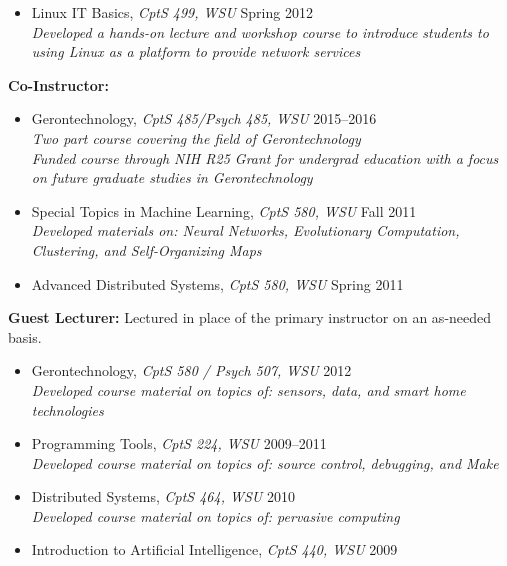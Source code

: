   \begin{itemize}
    \item{Linux IT Basics, \textit{CptS 499, WSU} \hfill Spring 2012} \\
    \indent \textit{Developed a hands-on lecture and workshop course to introduce students to} \\
    \indent \textit{using Linux as a platform to provide network services}
  \end{itemize}


\textbf{Co-Instructor:}
  \begin{itemize}
    \item{Gerontechnology, \textit{CptS 485/Psych 485, WSU} \hfill 2015--2016} \\
    \indent \textit{Two part course covering the field of Gerontechnology} \\
    \indent \textit{Funded course through NIH R25 Grant for undergrad education with a focus on future graduate studies in Gerontechnology}
  \end{itemize}

    \begin{itemize}
       \item{Special Topics in Machine Learning, \textit{CptS 580, WSU} \hfill Fall 2011} \\
	\indent \textit{Developed materials on: Neural Networks, Evolutionary Computation,} \\
	\indent \textit{Clustering, and Self-Organizing Maps}
	\item{Advanced Distributed Systems, \textit{CptS 580, WSU} \hfill Spring 2011}
    \end{itemize}

\textbf{Guest Lecturer:} Lectured in place of the primary instructor on an as-needed basis.
    \begin{itemize}
	\item{Gerontechnology, \textit{CptS 580 / Psych 507, WSU} \hfill 2012} \\
	\indent \textit{Developed course material on topics of: sensors, data, and smart home technologies}
	\item{Programming Tools, \textit{CptS 224, WSU} \hfill 2009--2011} \\
	\indent \textit{Developed course material on topics of: source control, debugging, and Make}
	\item{Distributed Systems, \textit{CptS 464, WSU} \hfill 2010} \\
	\indent \textit{Developed course material on topics of: pervasive computing}
	\item{Introduction to Artificial Intelligence, \textit{CptS 440, WSU} \hfill 2009}
    \end{itemize}


